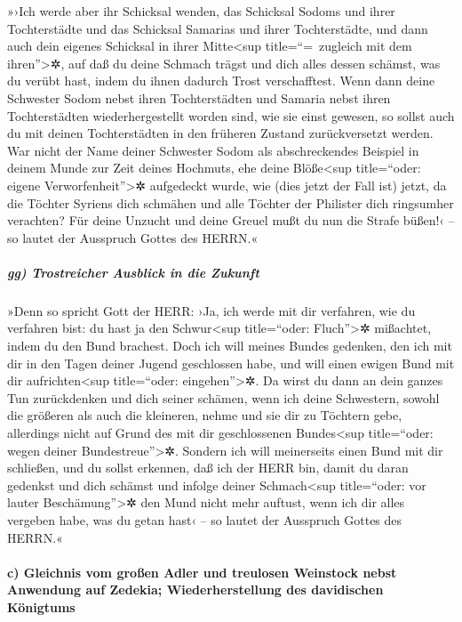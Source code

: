 »›Ich werde aber ihr Schicksal wenden, das Schicksal
Sodoms und ihrer Tochterstädte und das Schicksal Samarias und ihrer
Tochterstädte, und dann auch dein eigenes Schicksal in ihrer
Mitte\textless sup title=``=~zugleich mit dem ihren''\textgreater✲,
auf daß du deine Schmach trägst und dich alles dessen
schämst, was du verübt hast, indem du ihnen dadurch Trost verschafftest.
Wenn dann deine Schwester Sodom nebst ihren
Tochterstädten und Samaria nebst ihren Tochterstädten wiederhergestellt
worden sind, wie sie einst gewesen, so sollst auch du mit deinen
Tochterstädten in den früheren Zustand zurückversetzt werden.
War nicht der Name deiner Schwester Sodom als
abschreckendes Beispiel in deinem Munde zur Zeit deines Hochmuts,
ehe deine Blöße\textless sup title=``oder: eigene
Verworfenheit''\textgreater✲ aufgedeckt wurde, wie (dies jetzt der Fall
ist) jetzt, da die Töchter Syriens dich schmähen und alle Töchter der
Philister dich ringsumher verachten? Für deine Unzucht
und deine Greuel mußt du nun die Strafe büßen!‹ -- so lautet der
Ausspruch Gottes des HERRN.«

\hypertarget{gg-trostreicher-ausblick-in-die-zukunft}{%
\subparagraph{gg) Trostreicher Ausblick in die
Zukunft}\label{gg-trostreicher-ausblick-in-die-zukunft}}

»Denn so spricht Gott der HERR: ›Ja, ich werde mit dir
verfahren, wie du verfahren bist: du hast ja den Schwur\textless sup
title=``oder: Fluch''\textgreater✲ mißachtet, indem du den Bund
brachest. Doch ich will meines Bundes gedenken, den ich
mit dir in den Tagen deiner Jugend geschlossen habe, und will einen
ewigen Bund mit dir aufrichten\textless sup title=``oder:
eingehen''\textgreater✲. Da wirst du dann an dein ganzes
Tun zurückdenken und dich seiner schämen, wenn ich deine Schwestern,
sowohl die größeren als auch die kleineren, nehme und sie dir zu
Töchtern gebe, allerdings nicht auf Grund des mit dir geschlossenen
Bundes\textless sup title=``oder: wegen deiner
Bundestreue''\textgreater✲. Sondern ich will meinerseits
einen Bund mit dir schließen, und du sollst erkennen, daß ich der HERR
bin, damit du daran gedenkst und dich schämst und infolge
deiner Schmach\textless sup title=``oder: vor lauter
Beschämung''\textgreater✲ den Mund nicht mehr auftust, wenn ich dir
alles vergeben habe, was du getan hast‹ -- so lautet der Ausspruch
Gottes des HERRN.«

\hypertarget{c-gleichnis-vom-grouxdfen-adler-und-treulosen-weinstock-nebst-anwendung-auf-zedekia-wiederherstellung-des-davidischen-kuxf6nigtums}{%
\paragraph{c) Gleichnis vom großen Adler und treulosen Weinstock nebst
Anwendung auf Zedekia; Wiederherstellung des davidischen
Königtums}\label{c-gleichnis-vom-grouxdfen-adler-und-treulosen-weinstock-nebst-anwendung-auf-zedekia-wiederherstellung-des-davidischen-kuxf6nigtums}}

